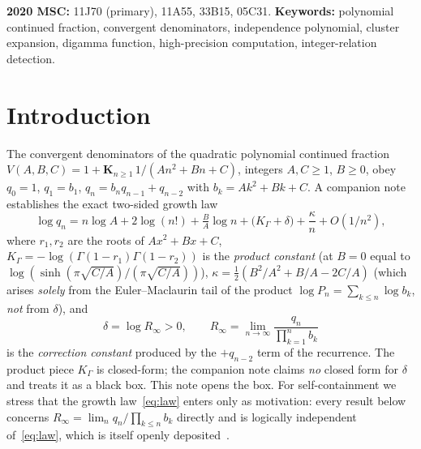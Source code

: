 \documentclass[11pt]{article}
\newcommand{\Rinf}{R_\infty}
\begin{document}
\noindent\textbf{2020 MSC:} 11J70 (primary), 11A55, 33B15, 05C31.\quad
\textbf{Keywords:} polynomial continued fraction, convergent denominators,
independence polynomial, cluster expansion, digamma function, high-precision
computation, integer-relation detection.

\section{Introduction}

The convergent denominators of the quadratic polynomial continued fraction
$V(A,B,C)=1+\mathbf{K}_{n\ge1}\,1/(An^2+Bn+C)$, integers $A,C\ge1$, $B\ge0$, obey
$q_0=1$, $q_1=b_1$, $q_n=b_nq_{n-1}+q_{n-2}$ with $b_k=Ak^2+Bk+C$. A companion
note~\cite{growth} establishes the exact two-sided growth law
\begin{equation}\label{eq:law}
  \log q_n=n\log A+2\log(n!)+\tfrac{B}{A}\log n+\big(K_\Gamma+\delta\big)
           +\frac{\kappa}{n}+O(1/n^2),
\end{equation}
where $r_1,r_2$ are the roots of $Ax^2+Bx+C$,
$K_\Gamma=-\log(\Gamma(1-r_1)\Gamma(1-r_2))$ is the \emph{product constant} (at
$B=0$ equal to $\log(\sinh(\pi\sqrt{C/A})/(\pi\sqrt{C/A}))$),
$\kappa=\tfrac12(B^2/A^2+B/A-2C/A)$ (which arises \emph{solely} from the
Euler--Maclaurin tail of the product $\log P_n=\sum_{k\le n}\log b_k$, \emph{not} from
$\delta$), and
\begin{equation}\label{eq:delta}
  \delta=\log\Rinf>0,\qquad \Rinf=\lim_{n\to\infty}\frac{q_n}{\prod_{k=1}^n b_k}
\end{equation}
is the \emph{correction constant} produced by the $+q_{n-2}$ term of the recurrence.
The product piece $K_\Gamma$ is closed-form; the companion note claims \emph{no}
closed form for $\delta$ and treats it as a black box. This note opens the box.
For self-containment we stress that the growth law~\eqref{eq:law} enters only as
motivation: every result below concerns $\Rinf=\lim_n q_n/\prod_{k\le n}b_k$ directly and
is logically independent of~\eqref{eq:law}, which is itself openly deposited~\cite{growth}.
\end{document}
